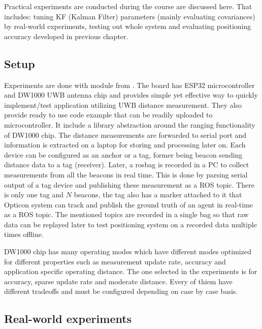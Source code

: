 Practical experiments are conducted during the course are discussed here. That includes: tuning KF (Kalman Filter) parameters (mainly evaluating covariances) by real-world experiments, testing out whole system and evaluating positioning accuracy developed in previous chapter.

\subsection{Setup}

Experiments are done with module from \cite{makerfabs}. The board has ESP32 microcontroller and DW1000 UWB antenna chip and provides simple yet effective way to quickly implement/test application utilizing UWB distance measurement. They also provide ready to use code example that can be readily uploaded to microcontroller. It include a library abstraction around the ranging functionality of DW1000 chip. The distance measurements are forwarded to serial port and information is extracted on a laptop for storing and processing later on. Each device can be configured as an anchor or a tag, former being beacon sending distance data to a tag (receiver). Later, a rosbag is recorded in a PC to collect measurements from all the beacons in real time. This is done by parsing serial output of a tag device and publishing these measurement as a ROS topic. There is only one tag and $N$ beacons, the tag also has a marker attached to it that Opticon system can track and publish the ground truth of an agent in real-time as a ROS topic. The mentioned topics are recorded in a single bag so that raw data can be replayed later to test positioning system on a recorded data multiple times offline.

DW1000 chip has many operating modes which have different modes optimized for different properties such as measurement update rate, accuracy and application specific operating distance. The one selected in the experiments is for accuracy, sparse update rate and moderate distance. Every of thiem have different tradeoffs and must be configured depending on case by case basis.

\subsection{Real-world experiments}

